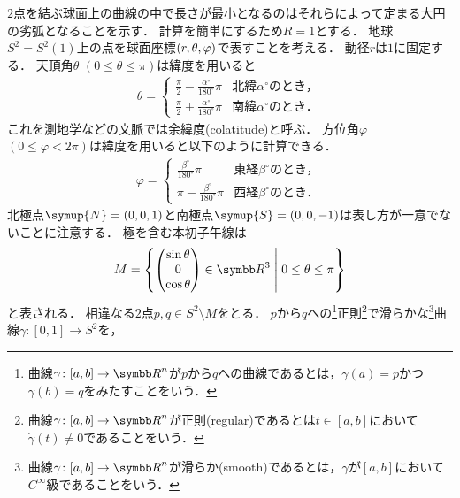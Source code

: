 \documentclass{ltjsbook}
\begin{document}

\(2\)点を結ぶ球面上の曲線の中で長さが最小となるのはそれらによって定まる大円の劣弧となることを示す．
計算を簡単にするため\(R = 1\)とする．
地球\(S^2 = S^2(1)\)上の点を球面座標\((r, \theta, \varphi)\)で表すことを考える．
動径\(r\)は\(1\)に固定する．
天頂角\(\theta\) \((0 \leq \theta \leq \pi)\)は緯度を用いると
\begin{align*}
    \theta = \begin{cases}
        \displaystyle
        \frac{\pi}{2} - \frac{\alpha^\circ}{180^\circ} \pi
        & \text{北緯\(\alpha^\circ\)のとき，} \\[10pt]
        \displaystyle
        \frac{\pi}{2} + \frac{\alpha^\circ}{180^\circ} \pi
        & \text{南緯\(\alpha^\circ\)のとき．}
    \end{cases}
\end{align*}
これを測地学などの文脈では余緯度(colatitude)と呼ぶ．
方位角\(\varphi\) \((0 \leq \varphi < 2\pi)\)は緯度を用いると以下のように計算できる．
\begin{align*}
    \varphi = \begin{cases}
        \displaystyle
        \frac{\beta^\circ}{180^\circ} \pi
        & \text{東経\(\beta^\circ\)のとき，} \\[10pt]
        \displaystyle
        \pi - \frac{\beta^\circ}{180^\circ} \pi
        & \text{西経\(\beta^\circ\)のとき．}
    \end{cases}
\end{align*}
北極点\(\symup{N} = (0, 0, 1)\)と南極点\(\symup{S} = (0, 0, -1)\)は表し方が一意でないことに注意する．
極を含む本初子午線は
\begin{align*}
    M = \left\{\begin{pmatrix} \sin \theta \\ 0 \\ \cos \theta \end{pmatrix} \in {\Real}^3 \relmiddle{|} 0 \leq \theta \leq \pi\right\}
\end{align*}
と表される．
相違なる\(2\)点\(p, q \in S^2 \setminus M\)をとる．
\(p\)から\(q\)への\footnote{%
曲線\(\gamma\colon [a, b] \to {\Real}^n\)が\(p\)から\(q\)への曲線であるとは，\(\gamma(a) = p\)かつ\(\gamma(b) = q\)をみたすことをいう．
}正則\footnote{%
曲線\(\gamma\colon [a, b] \to {\Real}^n\)が正則(regular)であるとは\(t \in [a, b]\)において\(\dot{\gamma}(t) \neq 0\)であることをいう．
}で滑らかな\footnote{%
曲線\(\gamma\colon [a, b] \to {\Real}^n\)が滑らか(smooth)であるとは，\(\gamma\)が\([a, b]\)において\(C^\infty\)級であることをいう．
}曲線\(\gamma \colon [0, 1] \to S^2\)を，
\end{document}
